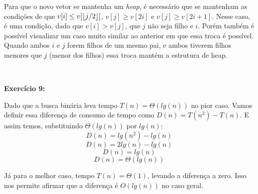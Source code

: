 \documentclass{article}
\DeclarePairedDelimiter\floor{\lfloor}{\rfloor}
\begin{document}
Para que o novo vetor se mantenha um \textit{heap}, é necessário que se mantenham as condições de que $v[i] \leq v[\floor*{j/2}]$, $v[j] \geq v[2i]$ e $v[j] \geq v[2i + 1]$. Nesse caso, é uma condição, dado que $v[i] > v[j]$, que $j$ não seja filho e $i$. Porém também é possível visualizar um caso muito similar ao anterior em que essa troca é possível. Quando ambos $i$ e $j$ forem filhos de um mesmo pai, e ambos tiverem filhos menores que $j$ (menor dos filhos) essa troca mantém a estrutura de heap.

\

\textbf{Exercício 9:}

Dado que a busca binária leva tempo $T(n) = \Theta{(lg(n))}$ no pior caso. Vamos definir essa diferença de consumo de tempo como $D(n) = T(n^2) - T(n)$. E assim temos, substituindo $\Theta{(lg(n))}$ por $lg(n)$:
$$D(n) = lg(n^2) - lg(n) $$
$$D(n) = 2lg(n) - lg(n)$$
$$D(n) = lg(n)$$
$$D(n) = \Theta{(lg(n))}$$

Já para o melhor caso, tempo $T(n) = \Theta{(1)}$, levando a diferença a zero. Isso nos permite afirmar que a diferença é $O(lg(n))$ no caso geral.
\end{document}
